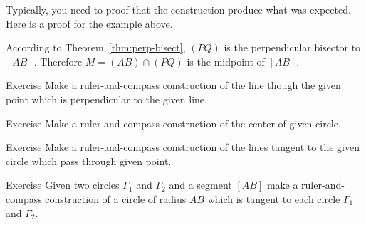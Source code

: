\medskip

Typically, you need to proof that the construction produce what was expected. Here is a proof for the example above.

According to Theorem~\ref{thm:perp-bisect}, $(PQ)$ is the perpendicular bisector to $[AB]$.
Therefore $M=(AB)\cap(PQ)$ is the midpoint of $[AB]$. 
\qeds

\begin{thm}{Exercise}\label{ex:construction-perpendicular}
Make a ruler-and-compass construction of the line though the given point which is perpendicular to the given line.
\end{thm}

\begin{thm}{Exercise}\label{ex:center}
Make a ruler-and-compass construction of the center of given circle.
\end{thm}

\begin{thm}{Exercise}\label{ex:tangent}
Make a ruler-and-compass construction of the lines tangent to the given circle which pass through given point.
\end{thm}

\begin{thm}{Exercise}\label{ex:tangent-circle}
Given two circles $\Gamma_1$ and $\Gamma_2$ and a segment $[AB]$
make a ruler-and-compass construction of a circle of radius $AB$ 
which is tangent to each circle $\Gamma_1$ and $\Gamma_2$.
\end{thm}




